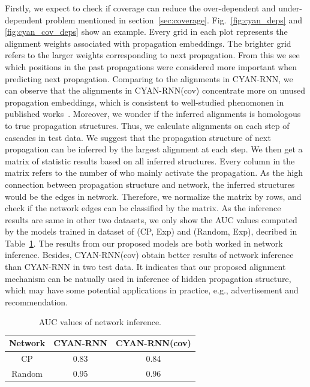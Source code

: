 Firstly, we expect to check if coverage can reduce the over-dependent and
under-dependent problem mentioned in section~\ref{sec:coverage}.
Fig.~\ref{fig:cyan_deps} and \ref{fig:cyan_cov_deps} show an example. Every grid
in each plot represents the alignment weights associated with propagation
embeddings.
The brighter grid refers to the larger weights corresponding to next
propagation. From this we see which positions in the past propagations
were considered more important when predicting next propagation. Comparing to
the alignments in CYAN-RNN, we can observe that the alignments in CYAN-RNN(cov)
concentrate more on unused propagation embeddings, which is consistent to
well-studied phenomonen in published works~\cite{}. Moreover, we wonder if the
inferred alignments is homologous to true propagation structures. Thus, we
calculate alignments on each step of cascades in test data. We suggest that the
propagation structure of next propagation can be inferred by the largest
alignment at each step. We then get a matrix of statistic results based on all inferred
structures. Every column in the matrix refers to the number of who mainly
activate the propagation. As the high connection between propagation
structure and network, the inferred structures would be the edges in
network. Therefore, we normalize the matrix by rows, and check if the
network edges can be classified by the matrix. As the
inference results are same in other two datasets, we only show the AUC values
computed by the models trained in dataset of (CP, Exp) and (Random, Exp),
decribed in Table~\ref{t:auc_net_inf}. The results from our proposed models
are both worked in network inference. Besides, CYAN-RNN(cov) obtain better results of
network inference than CYAN-RNN in two test data. It indicates that our
proposed alignment mechanism can be natually used in inference of hidden
propagation structure, which may have some potential applications in practice,
e.g., advertisement and recommendation.



\begin{table}[h!]
\centering
\caption{AUC values of network inference.}
\begin{tabular*}{.38\textwidth}{c|cc} \hline
Network & CYAN-RNN & CYAN-RNN(cov) \\ \hline
CP & 0.83 & 0.84 \\
Random & 0.95 & 0.96 \\ \hline
\end{tabular*}
\label{t:auc_net_inf}
\end{table}

